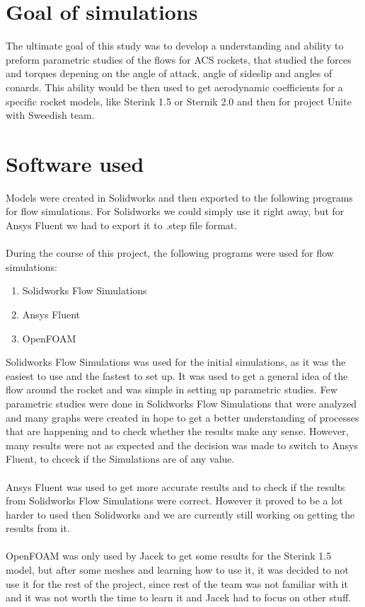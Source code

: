 \section{Goal of simulations}
The ultimate goal of this study was to develop a understanding and ability to preform parametric
studies of the flows for ACS rockets, that studied the forces and torques depening on the angle of 
attack, angle of sideslip and angles of conards. This ability would be then used to get aerodynamic 
coefficients for a specific rocket models, like Sterink 1.5 or Sternik 2.0 and then for project 
Unite with Sweedish team.


\section{Software used}
Models were created in Solidworks and then exported to the following programs for flow simulations.
For Solidworks we could simply use it right away, but for Ansys Fluent we had to export 
it to .step file format.\\\\
During the course of this project, the following programs were used for flow simulations:
\begin{enumerate}
    \item Solidworks Flow Simulations
    \item Ansys Fluent
    \item OpenFOAM
\end{enumerate}
Solidworks Flow Simulations was used for the initial simulations, as it was the easiest to use and
the fastest to set up. It was used to get a general idea of the flow around the rocket and was 
simple in setting up parametric studies. Few parametric studies were done in Solidworks Flow 
Simulations that were analyzed and many graphs were created in hope to get a better understanding 
of processes that are happening and to check whether the results make any sense. However, many
results were not as expected and the decision was made to switch to Ansys Fluent, to chceck if the 
Simulations are of any value.\\\\
Ansys Fluent was used to get more accurate results and to check if the results from Solidworks
Flow Simulations were correct. However it proved to be a lot harder to used then Solidworks and
we are currently still working on getting the results from it.\\\\
OpenFOAM was only used by Jacek to get some results for the Sterink 1.5 model, but after some meshes
and learning how to use it, it was decided to not use it for the rest of the project, since rest 
of the team was not familiar with it and it was not worth the time to learn it and Jacek had to 
focus on other stuff.